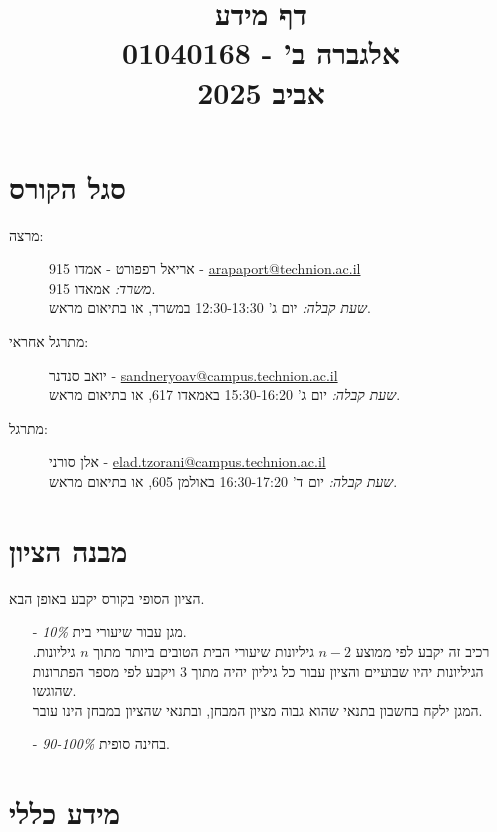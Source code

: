 \documentclass{article}
\title{דף מידע \\ אלגברה ב' - 01040168 \\ אביב 2025}
\date{}
\begin{document}
\maketitle

\section*{סגל הקורס}

\begin{description}
\item[מרצה:]
אריאל רפפורט
-
אמדו 915
-
\textenglish{\href{mailto:arapaport@technion.ac.il}{arapaport@technion.ac.il}}
\\
\emph{משרד:}
אמאדו 915.
\\
\emph{שעת קבלה:}
יום ג' 12:30-13:30 במשרד, או בתיאום מראש.

\item[מתרגל אחראי:] 
יואב סנדנר
-
\textenglish{\href{mailto:sandneryoav@campus.technion.ac.il}{sandneryoav@campus.technion.ac.il}}
\\
\emph{שעת קבלה:}
יום ג' 15:30-16:20 באמאדו 617, או בתיאום מראש.

\item[מתרגל:] 
אלן סורני
-
\textenglish{\href{mailto:elad.tzorani@campus.technion.ac.il}{elad.tzorani@campus.technion.ac.il}}
\\
\emph{שעת קבלה:}
יום ד' 16:30-17:20 באולמן 605, או בתיאום מראש.

\end{description}

\section*{מבנה הציון}

הציון הסופי בקורס יקבע באופן הבא.

\begin{itemize}
\item[-] \emph{10\%}
מגן עבור שיעורי בית.
\\
רכיב זה יקבע לפי ממוצע $n-2$ גיליונות שיעורי הבית הטובים ביותר מתוך $n$ גיליונות. הגיליונות יהיו שבועיים והציון עבור כל גיליון יהיה מתוך 3 ויקבע לפי מספר הפתרונות שהוגשו.
\\
המגן ילקח בחשבון בתנאי שהוא גבוה מציון המבחן, ובתנאי שהציון במבחן הינו עובר.
\item[-] \emph{90-100\%}
בחינה סופית.
\end{itemize}

\section*{מידע כללי}
\end{document}

